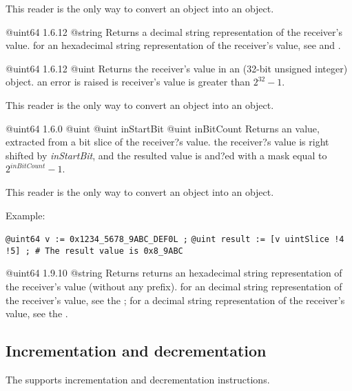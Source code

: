 This reader is the only way to convert an  object into an  object.


{@uint64}
{1.6.12}
{@string}
{Returns a decimal string representation of the receiver's value.}
{for an hexadecimal string representation of the receiver's value, see  and .}



{@uint64}
{1.6.12}
{@uint}
{Returns the receiver's value in an  (32-bit unsigned integer) object.}
{an error is raised is receiver's value is greater than $2^{32}-1$.}

This reader is the only way to convert an  object into an  object.


{@uint64}
{1.6.0}
{@uint}
{@uint inStartBit}
{@uint inBitCount}
{Returns an  value, extracted from a bit slice of the receiver?s value.}
{the receiver?s value is right shifted by \emph{inStartBit}, and the resulted value is and?ed with a mask equal to $2^{inBitCount}-1$.}

This reader is the only way to convert an  object into an  object.

Example:

\texttt{@uint64 v := 0x1234\_5678\_9ABC\_DEF0L ;}\newline
\texttt{@uint result := [v uintSlice !4 !5] ; \# The result value is 0x8\_9ABC}




{@uint64}
{1.9.10}
{@string}
{Returns returns an hexadecimal string representation of the receiver's value (without any prefix).}
{for an decimal string representation of the receiver's value, see the ; for a decimal string representation of the receiver's value, see the .}






\subsection{Incrementation and decrementation}

The  supports incrementation and decrementation instructions.

